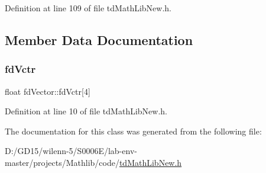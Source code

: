 Definition at line 109 of file td\+Math\+Lib\+New.\+h.



\subsection{Member Data Documentation}
\hypertarget{classfd_vector_a308672d043f9518b2c607e8b839ed476}{}\label{classfd_vector_a308672d043f9518b2c607e8b839ed476} 
\subsubsection{\texorpdfstring{fd\+Vctr}{fdVctr}}
{\footnotesize\ttfamily float fd\+Vector\+::fd\+Vctr\mbox{[}4\mbox{]}\hspace{0.3cm}{\ttfamily [private]}}



Definition at line 10 of file td\+Math\+Lib\+New.\+h.



The documentation for this class was generated from the following file\+:\begin{DoxyCompactItemize}
\item 
D\+:/\+G\+D15/wilenn-\/5/\+S0006\+E/lab-\/env-\/master/projects/\+Mathlib/code/\hyperlink{td_math_lib_new_8h}{td\+Math\+Lib\+New.\+h}\end{DoxyCompactItemize}
